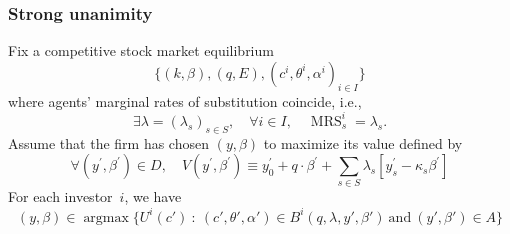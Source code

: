 \documentclass[blue]{beamer}
\DeclareMathOperator\argmax{argmax}
\DeclareMathOperator\MRS{MRS}
\theoremstyle{definition}
\theoremstyle{example}
\begin{document}

\begin{frame}\frametitle{Strong unanimity}

\begin{theorem}
Fix a competitive stock market equilibrium
\[
\{(k,\beta),(q,E),(c^i,\theta^i,\alpha^i)_{i\in I}\}
\]
where \alert{agents' marginal rates of substitution coincide}, i.e.,
\[
\exists \lambda=(\lambda_s)_{s\in S}, \quad \forall i\in I, \quad \MRS^i_s = \lambda_s.
\]
Assume that the firm has chosen $(y,\beta)$ to maximize its value defined by
\[
\forall (y^\prime,\beta^\prime) \in D, \quad V(y^\prime,\beta^\prime) \equiv y_0^\prime + q\cdot \beta^\prime + \sum_{s\in S} \lambda_s [y_s^\prime - \kappa_s \beta^\prime]
\]
For each investor~$i$, we have
\[
(y,\beta) \in \argmax \{ U^i(c') \ \colon \ (c',\theta',\alpha') \in B^i(q,\lambda,y',\beta') \ \textrm{and} \ (y',\beta') \in A \}
\]
\end{theorem}

\end{frame}
\end{document}
